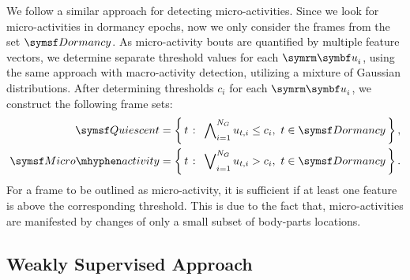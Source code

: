 We follow a similar approach for detecting micro-activities.
Since we look for micro-activities in dormancy epochs, now we only consider the frames from the set $\Dormancy$.
As micro-activity bouts are quantified by multiple feature vectors, we determine separate threshold values for each $\V{u}_i$, using the same approach with macro-activity detection, utilizing a mixture of Gaussian distributions.
After determining thresholds $c_i$ for each $\V{u}_i$, we construct the following frame sets:
\begin{equation}
	\begin{aligned}
		\Quiescent     & = \Set{t}{\bigwedge\nolimits_{i=1}^{N_G} u_{t,i} \leq c_i, \ t \in \Dormancy}, \\
		\MicroActivity & = \Set{t}{\bigvee\nolimits_{i=1}^{N_G} u_{t,i} > c_i, \ t \in \Dormancy}.
	\end{aligned}
\end{equation}
For a frame to be outlined as micro-activity, it is sufficient if at least one feature is above the corresponding threshold.
This is due to the fact that, micro-activities are manifested by changes of only a small subset of body-parts locations.

\subsection{Weakly Supervised Approach}
